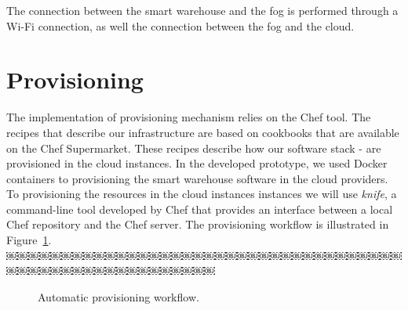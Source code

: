 The connection between the smart warehouse and the fog is performed through a Wi-Fi connection, as
well the connection between the fog and the cloud.

\section{Provisioning}
\label{sec:provisioning}
The implementation of provisioning mechanism relies on the Chef tool. The recipes that describe our
infrastructure are based on cookbooks that are available on the Chef Supermarket. These recipes
describe how our software stack - are provisioned in the cloud instances. In the developed prototype,
we used Docker containers to provisioning the smart warehouse software in the cloud providers.
To provisioning the resources in the cloud instances instances we will use \textit{knife}, a command-line
tool developed by Chef that provides an interface between a local Chef repository and the Chef server.
The provisioning workflow is illustrated in Figure~\ref{fig:provisioning_tech_architecture}.\\ ￼￼￼￼￼￼￼￼￼￼￼￼￼￼￼￼￼￼￼￼￼￼￼￼￼￼￼￼￼￼￼￼￼￼￼￼￼￼￼￼￼￼￼￼￼￼￼￼￼￼￼￼￼￼￼

\begin{figure}[!ht]
  \centering
  \caption{Automatic provisioning workflow.}
  \label{fig:provisioning_tech_architecture}
\end{figure}

